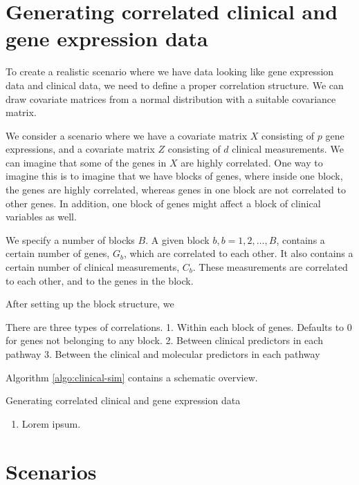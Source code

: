 \section{Generating correlated clinical and gene expression data}
To create a realistic scenario where we have data looking like gene expression data and clinical data, we need to define a proper correlation structure.
We can draw covariate matrices from a normal distribution with a suitable covariance matrix.

We consider a scenario where we have a covariate matrix $X$ consisting of $p$ gene expressions, and a covariate matrix $Z$ consisting of $d$ clinical measurements.
We can imagine that some of the genes in $X$ are highly correlated.
One way to imagine this is to imagine that we have blocks of genes,
where inside one block, the genes are highly correlated, whereas genes in one block are not correlated to other genes.
In addition, one block of genes might affect a block of clinical variables as well.

We specify a number of blocks $B$. A given block $b,b=1,2,\ldots,B$, contains a certain number of genes, $G_b$, which are correlated to each other.
It also contains a certain number of clinical measurements, $C_b$. These measurements are correlated to each other, and to the genes in the block.

After setting up the block structure, we 

There are three types of correlations.
1. Within each block of genes. Defaults to 0 for genes not belonging to any block.
2. Between clinical predictors in each pathway
3. Between the clinical and molecular predictors in each pathway

Algorithm \ref{algo:clinical-sim} contains a schematic overview.

\begin{algorithm}
\caption{Generating correlated clinical and gene expression data}
\label{algo:clinical-sim}
\begin{enumerate}
    \item Lorem ipsum.
\end{enumerate}
\end{algorithm}

\section{Scenarios}

